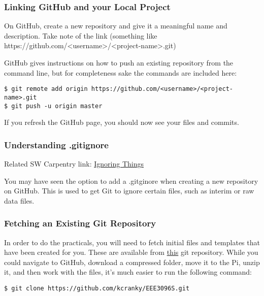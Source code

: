 \subsubsection{Linking GitHub and your Local Project}
On GitHub, create a new repository and give it a meaningful name and description. Take note of the link (something like https://github.com/\textless username\textgreater /\textless project-name\textgreater .git)

GitHub gives instructions on how to push an existing repository from the command line, but for completeness sake the commands are included here:
\begin{lstlisting}
$ git remote add origin https://github.com/<username>/<project-name>.git
$ git push -u origin master    
\end{lstlisting}

If you refresh the GitHub page, you should now see your files and commits.

\subsubsection{Understanding .gitignore}
Related SW Carpentry link: \href{https://swcarpentry.github.io/git-novice/06-ignore/index.html}{Ignoring Things}

You may have seen the option to add a .gitginore when creating a new repository on GitHub. This is used to get Git to ignore certain files, such as interim or raw data files. 

\subsubsection{Fetching an Existing Git Repository}
In order to do the practicals, you will need to fetch initial files and templates that have been created for you. These are available from \href{https://github.com/kcranky/EEE3096S}{this} git repository. While you could navigate to GitHub, download a compressed folder, move it to the Pi, unzip it, and then work with the files, it's much easier to run the following command:
\begin{lstlisting}
$ git clone https://github.com/kcranky/EEE3096S.git
\end{lstlisting}